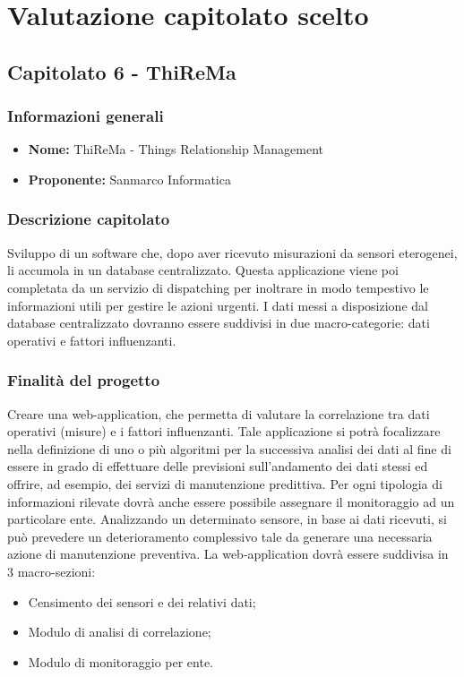 

\section{Valutazione capitolato scelto}

	\subsection{Capitolato 6 - ThiReMa}
	
	\subsubsection{Informazioni generali}
	\begin{itemize}
		\item \textbf{Nome:} ThiReMa - Things Relationship Management
		\item \textbf{Proponente:} Sanmarco Informatica
	\end{itemize}
	
	\subsubsection{Descrizione capitolato}
	Sviluppo di un software che,  dopo aver ricevuto misurazioni da sensori eterogenei, li accumola in un database centralizzato. Questa applicazione viene poi completata da un servizio di dispatching per inoltrare in modo tempestivo le informazioni utili per gestire le azioni urgenti.
	I dati messi a disposizione dal database centralizzato dovranno essere suddivisi in due macro-categorie: dati operativi e fattori influenzanti.
	
	\subsubsection{Finalità del progetto}
	Creare una web-application, che permetta di valutare la correlazione tra dati operativi (misure) e i fattori influenzanti. Tale applicazione si potrà focalizzare nella definizione di uno o più algoritmi per la successiva analisi dei dati al fine di essere in grado di effettuare delle previsioni sull’andamento dei dati stessi ed offrire, ad esempio, dei servizi di manutenzione predittiva.
	Per ogni tipologia di informazioni rilevate dovrà anche essere possibile assegnare il monitoraggio ad un particolare ente. 
	Analizzando un determinato sensore, in base ai dati ricevuti, si può prevedere un deterioramento complessivo tale da generare una necessaria azione di manutenzione preventiva.
	La web-application dovrà essere suddivisa in 3 macro-sezioni:
	\begin{itemize}
		\item Censimento dei sensori e dei relativi dati;
		\item Modulo di analisi di correlazione;
		\item Modulo di monitoraggio per ente.
	\end{itemize}
	
